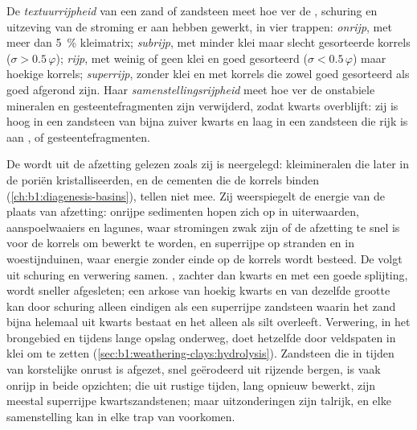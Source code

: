 \begin{definition}\label{def:b1:clastic-sediments:maturity}
De \emph{textuurrijpheid} van een zand of zandsteen meet hoe ver de , schuring en uitzeving van de stroming er aan hebben gewerkt, in vier trappen: \emph{onrijp}, met meer dan \qty{5}{\percent} kleimatrix; \emph{subrijp}, met minder klei maar slecht gesorteerde korrels ($\sigma > 0.5\,\varphi$); \emph{rijp}, met weinig of geen klei en goed gesorteerd ($\sigma < 0.5\,\varphi$) maar hoekige korrels; \emph{superrijp}, zonder klei en met korrels die zowel goed gesorteerd als goed afgerond zijn. Haar \emph{samenstellingsrijpheid} meet hoe ver de onstabiele mineralen en gesteentefragmenten zijn verwijderd, zodat kwarts overblijft: zij is hoog in een zandsteen van bijna zuiver kwarts en laag in een zandsteen die rijk is aan ,  of gesteentefragmenten.
\end{definition}

De  wordt uit de afzetting gelezen zoals zij is neergelegd: kleimineralen die later in de poriën kristalliseerden, en de cementen die de korrels binden (\cref{ch:b1:diagenesis-basins}), tellen niet mee. Zij weerspiegelt de energie van de plaats van afzetting: onrijpe sedimenten hopen zich op in uiterwaarden, aanspoelwaaiers en lagunes, waar stromingen zwak zijn of de afzetting te snel is voor de korrels om bewerkt te worden, en superrijpe op stranden en in woestijnduinen, waar energie zonder einde op de korrels wordt besteed. De  volgt uit schuring en verwering samen. , zachter dan kwarts en met een goede splijting, wordt sneller afgesleten; een arkose van hoekig kwarts en  van dezelfde grootte kan door schuring alleen eindigen als een superrijpe zandsteen waarin het zand bijna helemaal uit kwarts bestaat en het  alleen als silt overleeft. Verwering, in het brongebied en tijdens lange opslag onderweg, doet hetzelfde door veldspaten in klei om te zetten (\cref{sec:b1:weathering-clays:hydrolysis}). Zandsteen die in tijden van korstelijke onrust is afgezet, snel geërodeerd uit rijzende bergen, is vaak onrijp in beide opzichten; die uit rustige tijden, lang opnieuw bewerkt, zijn meestal superrijpe kwartszandstenen; maar uitzonderingen zijn talrijk, en elke samenstelling kan in elke trap van  voorkomen.

